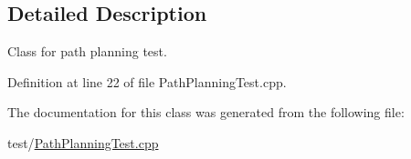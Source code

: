 \subsection{Detailed Description}
Class for path planning test. 

Definition at line 22 of file Path\+Planning\+Test.\+cpp.



The documentation for this class was generated from the following file\+:\begin{DoxyCompactItemize}
\item 
test/\hyperlink{_path_planning_test_8cpp}{Path\+Planning\+Test.\+cpp}\end{DoxyCompactItemize}
